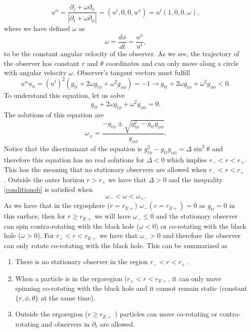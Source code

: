 \begin{equation}
 u^\alpha=\frac{\partial_{\bar{t}}+\omega \partial_\phi}{|\partial_{\bar{t}}+\omega \partial_\phi|}=(u^t,0,0,u^\phi)=u^t(1,0,0,\omega),
\end{equation}
where we have defined $\omega$ as
\begin{equation}
 \omega= \frac{d \phi}{d \bar{t}}=\frac{u^\phi}{u^t},
\end{equation}
to be the constant angular velocity of the observer. As we see, the trajectory of the observer has constant $r$ and $\theta$ coordinates and can only move along a circle with angular velocity $\omega$. Observer's tangent vectors must fulfill
\begin{equation}\label{conditionob}
 u^\alpha u_\alpha=(u^t)^2 \left( g_{tt}+ 2 \omega g_{t \phi}+ \omega^2 g_{\phi \phi} \right) =-1 \rightarrow  g_{tt}+ 2 \omega g_{t \phi}+ \omega^2 g_{\phi \phi}<0.
\end{equation}
To understand this equation, let us solve
\begin{equation}
  g_{tt}+ 2 \omega g_{t \phi}+ \omega^2 g_{\phi \phi}=0.
\end{equation}
The solutions of this equation are
\begin{equation}
 \omega_{\pm}=\frac{-g_{t\phi} \pm \sqrt{g_{t \phi}^2- g_{tt} g_{\phi \phi}} }{g_{\phi \phi}}.
\end{equation}
Notice that the discriminant of the equation is $g_{t \phi}^2- g_{tt} g_{\phi \phi}=\Delta \sin^2 \theta$ and therefore this equation has no real solutions for $\Delta <0 $ which implies $r_-<r<r_+$. This has the meaning that no stationary observers are allowed when  $r_-<r<r_+$ . Outside the outer horizon $r>r_+$ we have that $\Delta>0$ and the inequality \cref{conditionob} is satisfied when
\begin{equation}
 \omega_- <\omega <\omega_+.
\end{equation}
As we have that in the ergosphere ($r=r_{E+}$) $\omega_-(r=r_{E+})=0$ as $g_{tt}=0$ in this surface, then for $r \geq r_{E+}$ we will have $\omega_- \leq 0$ and the stationary observer can spin contra-rotating with the black hole ($\omega<0$) or co-rotating with the black hole ($\omega>0$). For $r_+<r<r_{E+}$ we have that $\omega_->0$ and therefore the observer can only rotate co-rotating with the black hole. This can be summarized as
\begin{enumerate}
 \item There is no stationary observer in the region $r_-<r<r_+$ .
 \item When a particle is in the ergoregion ($r_+<r<r_{E+}$, it can only move spinning co-rotating with the black hole and it cannot remain static (constant $\{r,\phi,\theta\}$ at the same time).
 \item Outside the ergoregion ($r \geq r_{E+}$ ) particles can move co-rotating or contra-rotating and observers in $\partial_t$ are allowed.
\end{enumerate}


